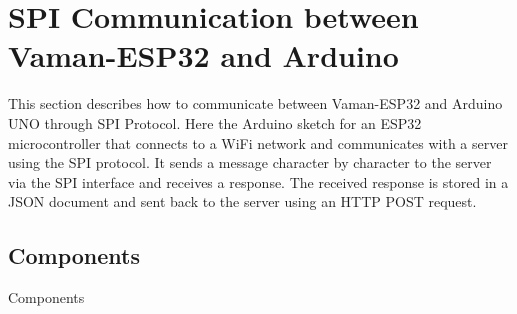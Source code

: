 \section{SPI Communication between Vaman-ESP32 and Arduino}
This section describes how to communicate between Vaman-ESP32 and Arduino UNO
through SPI Protocol. Here the Arduino sketch for an ESP32 microcontroller that
connects to a WiFi network and communicates with a server using the SPI
protocol. It sends a message character by character to the server via the SPI
interface and receives a response. The received response is stored in a JSON
document and sent back to the server using an HTTP POST request.

\subsection{Components}
\begin{table}[!ht]
\centering

\caption{Components}
\label{table:spi-components}
\end{table}

